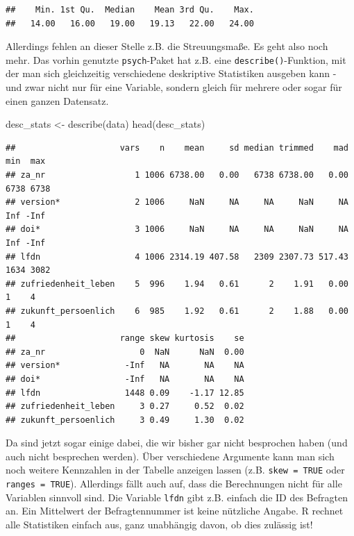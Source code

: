 \documentclass[
]{book}
\newenvironment{Shaded}{\begin{snugshade}}{\end{snugshade}}
\newcommand{\FunctionTok}[1]{\textcolor[rgb]{0.00,0.00,0.00}{#1}}
\newcommand{\NormalTok}[1]{#1}
\newcommand{\OtherTok}[1]{\textcolor[rgb]{0.56,0.35,0.01}{#1}}
\newcommand{\SpecialCharTok}[1]{\textcolor[rgb]{0.00,0.00,0.00}{#1}}
\begin{document}
\begin{Shaded}
\end{Shaded}

\begin{verbatim}
##    Min. 1st Qu.  Median    Mean 3rd Qu.    Max. 
##   14.00   16.00   19.00   19.13   22.00   24.00
\end{verbatim}

Allerdings fehlen an dieser Stelle z.B. die Streuungsmaße. Es geht also noch mehr. Das vorhin genutzte \texttt{psych}-Paket hat z.B. eine \texttt{describe()}-Funktion, mit der man sich gleichzeitig verschiedene deskriptive Statistiken ausgeben kann - und zwar nicht nur für eine Variable, sondern gleich für mehrere oder sogar für einen ganzen Datensatz.

\begin{Shaded}
\begin{Highlighting}[]
\NormalTok{desc\_stats }\OtherTok{\textless{}{-}} \FunctionTok{describe}\NormalTok{(data)}
\FunctionTok{head}\NormalTok{(desc\_stats)}
\end{Highlighting}
\end{Shaded}

\begin{verbatim}
##                     vars    n    mean     sd median trimmed    mad  min  max
## za_nr                  1 1006 6738.00   0.00   6738 6738.00   0.00 6738 6738
## version*               2 1006     NaN     NA     NA     NaN     NA  Inf -Inf
## doi*                   3 1006     NaN     NA     NA     NaN     NA  Inf -Inf
## lfdn                   4 1006 2314.19 407.58   2309 2307.73 517.43 1634 3082
## zufriedenheit_leben    5  996    1.94   0.61      2    1.91   0.00    1    4
## zukunft_persoenlich    6  985    1.92   0.61      2    1.88   0.00    1    4
##                     range skew kurtosis    se
## za_nr                   0  NaN      NaN  0.00
## version*             -Inf   NA       NA    NA
## doi*                 -Inf   NA       NA    NA
## lfdn                 1448 0.09    -1.17 12.85
## zufriedenheit_leben     3 0.27     0.52  0.02
## zukunft_persoenlich     3 0.49     1.30  0.02
\end{verbatim}

Da sind jetzt sogar einige dabei, die wir bisher gar nicht besprochen haben (und auch nicht besprechen werden). Über verschiedene Argumente kann man sich noch weitere Kennzahlen in der Tabelle anzeigen lassen (z.B. \texttt{skew\ =\ TRUE} oder \texttt{ranges\ =\ TRUE}). Allerdings fällt auch auf, dass die Berechnungen nicht für alle Variablen sinnvoll sind. Die Variable \texttt{lfdn} gibt z.B. einfach die ID des Befragten an. Ein Mittelwert der Befragtennummer ist keine nützliche Angabe. R rechnet alle Statistiken einfach aus, ganz unabhängig davon, ob dies zulässig ist!
\end{document}
